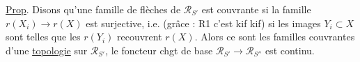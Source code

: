 \uline{Prop}.  Disons qu'une famille de flèches  de $\mathscr R_{S'}$ est couvrante si la famille $r(X_i)\longrightarrow r(X)$ est surjective, i.e. (grâce : R1 c'est kif kif) si les images $Y_i\subset X$ sont telles que les $r(Y_i)$ recouvrent $r(X)$. Alors ce sont les familles couvrantes d'une \uline{topologie} sur $\mathscr R_{S'}$,   le foncteur chgt de base $\mathscr R_{S'}\longrightarrow\mathscr R_{S''}$ est continu. \unsure{(donc|Comme|[donc}
